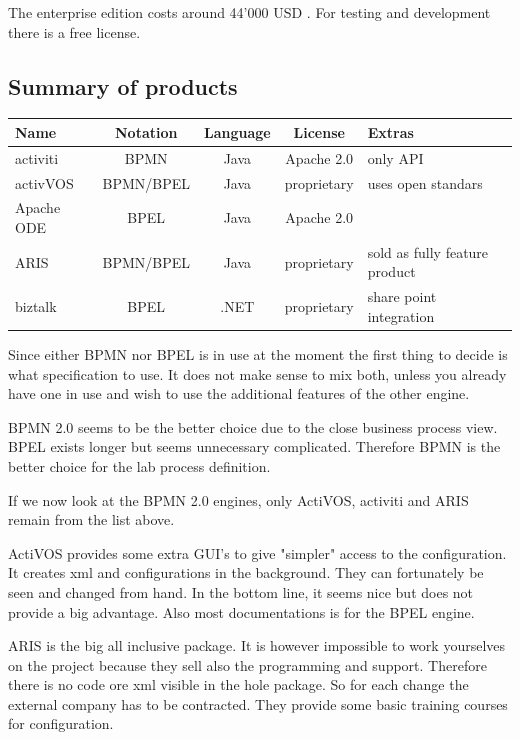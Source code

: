 \documentclass[paper=a4,twoside=false,BCOR=0mm,DIV=calc,fontsize=12pt]{scrartcl}
\begin{document}
The enterprise edition costs around 44'000 USD \cite{biztalkcost}. For testing and development there is a free license.


\subsection{Summary of products}

\begin{center}
\begin{tabular}{l | c c c p{3cm}}
\toprule

Name & Notation & Language & License & Extras \\

\midrule

activiti & BPMN & Java & Apache 2.0 & only API \\
activVOS & BPMN/BPEL & Java & proprietary &  uses open standars \\
Apache ODE & BPEL & Java & Apache 2.0 &   \\
ARIS & BPMN/BPEL & Java & proprietary &  sold as fully feature product \\
biztalk & BPEL & .NET & proprietary &  share point integration \\


\bottomrule
\end{tabular}

\label{tab:enginecomparison}
\end{center}

Since either BPMN nor BPEL is in use at the moment the first thing to decide is what specification to use.
It does not make sense to mix both, unless you already have one in use and wish to use the additional features of the other engine. 

BPMN 2.0 seems to be the better choice due to the close business process view. BPEL exists longer but seems unnecessary complicated.
Therefore BPMN is the better choice for the lab process definition. 

If we now look at the BPMN 2.0 engines, only ActiVOS, activiti and ARIS remain from the list above.

ActiVOS provides some extra GUI's to give "simpler" access to the configuration. It creates xml and configurations in the background.
They can fortunately be seen and changed from hand. In the bottom line, it seems nice but does not provide a big advantage. Also most documentations is for the BPEL engine.

ARIS is the big all inclusive package. It is however impossible to work yourselves on the project because they sell also the programming and support. Therefore there is no code ore xml visible in the hole package. So for each change the external company has to be contracted.
They provide some basic training courses for configuration.
\end{document}
